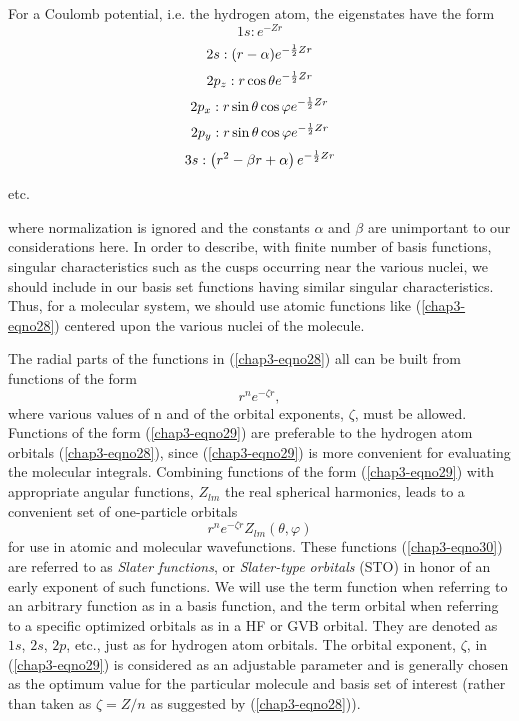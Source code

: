 For a Coulomb potential, i.e. the hydrogen atom, the eigenstates have the form
\begin{equation}
1s : e^{-Zr}
\end{equation}
\begin{equation}
2s : (r - \alpha ) e^{-{1 \over 2}Zr}
\end{equation}
\begin{equation}
2p_z : r \cos \theta e^{-{1 \over 2} Zr}
\end{equation}
\begin{equation}
2p_x : r \sin \theta \cos \varphi e^{-{1 \over 2} Zr}
\label{chap3-eqno28}
\end{equation}
\begin{equation}
2p_y : r \sin \theta \cos \varphi e^{-{1 \over 2} Zr}
\end{equation}
\begin{equation}
3s : \left( r^2 - \beta r + \alpha \right) e^{-{1 \over 2} Zr}
\end{equation}
\centerline{etc.}

\noindent
where normalization is ignored and the constants $\alpha$ and $\beta$
are unimportant to our considerations here.  In order to describe,
with finite number of basis functions, singular characteristics such
as the cusps occurring near the various nuclei, we should include in
our basis set functions having similar singular characteristics. Thus,
for a molecular system, we should use atomic functions like
(\ref{chap3-eqno28}) centered upon the various nuclei of the molecule.

The radial parts of the functions in (\ref{chap3-eqno28}) all can be
built from functions of the form
\begin{equation}
r^n e^{- \zeta r},
\label{chap3-eqno29}
\end{equation}
where various values of n and of the orbital exponents, $\zeta$, must
be allowed.  Functions of the form (\ref{chap3-eqno29}) are preferable
to the hydrogen atom orbitals (\ref{chap3-eqno28}), since
(\ref{chap3-eqno29}) is more convenient for evaluating the molecular
integrals. Combining functions of the form (\ref{chap3-eqno29}) with
appropriate angular functions, $Z_{lm}$ the real spherical harmonics,
leads to a convenient set of one-particle orbitals
\begin{equation}
r^n e^{- \zeta r} Z_{lm} \left( \theta , \varphi \right)
\label{chap3-eqno30}
\end{equation}
for use in atomic and molecular wavefunctions.  These functions
(\ref{chap3-eqno30}) are referred to as \emph{Slater functions}, or
\emph{Slater-type orbitals} (STO) in honor of an early exponent
\cite{chap3-ref5} of such functions.  We will use the term function
when referring to an arbitrary function as in a basis function, and
the term orbital when referring to a specific optimized orbitals as in
a HF or GVB orbital.  They are denoted as $1s$, $2s$, $2p$, etc., just
as for hydrogen atom orbitals.  The orbital exponent, $\zeta$, in
(\ref{chap3-eqno29}) is considered as an adjustable parameter and is
generally chosen as the optimum value for the particular molecule and
basis set of interest (rather than taken as $\zeta = Z/n$ as suggested
by (\ref{chap3-eqno28})).

